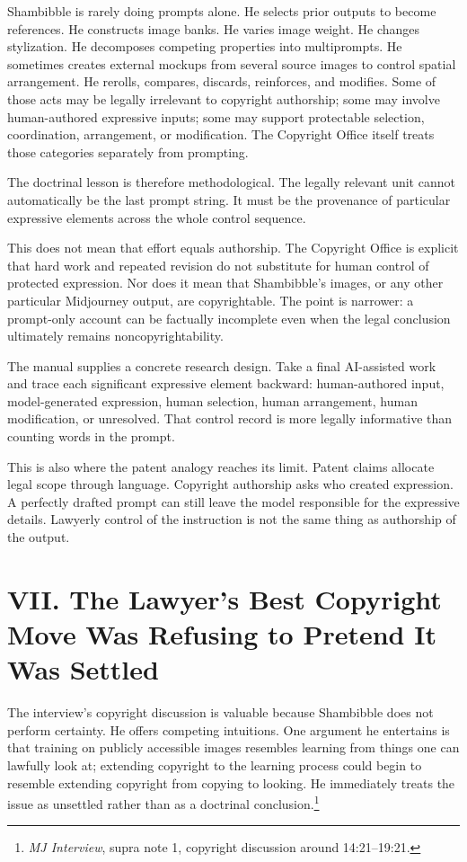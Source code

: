 \documentclass[11pt]{article}
\begin{document}
Shambibble is rarely doing prompts alone. He selects prior outputs to become references. He constructs image banks. He varies image weight. He changes stylization. He decomposes competing properties into multiprompts. He sometimes creates external mockups from several source images to control spatial arrangement. He rerolls, compares, discards, reinforces, and modifies. Some of those acts may be legally irrelevant to copyright authorship; some may involve human-authored expressive inputs; some may support protectable selection, coordination, arrangement, or modification. The Copyright Office itself treats those categories separately from prompting.

The doctrinal lesson is therefore methodological. The legally relevant unit cannot automatically be the last prompt string. It must be the provenance of particular expressive elements across the whole control sequence.

This does not mean that effort equals authorship. The Copyright Office is explicit that hard work and repeated revision do not substitute for human control of protected expression. Nor does it mean that Shambibble's images, or any other particular Midjourney output, are copyrightable. The point is narrower: a prompt-only account can be factually incomplete even when the legal conclusion ultimately remains noncopyrightability.

The manual supplies a concrete research design. Take a final AI-assisted work and trace each significant expressive element backward: human-authored input, model-generated expression, human selection, human arrangement, human modification, or unresolved. That control record is more legally informative than counting words in the prompt.

This is also where the patent analogy reaches its limit. Patent claims allocate legal scope through language. Copyright authorship asks who created expression. A perfectly drafted prompt can still leave the model responsible for the expressive details. Lawyerly control of the instruction is not the same thing as authorship of the output.

\section*{VII. The Lawyer's Best Copyright Move Was Refusing to Pretend It Was Settled}
The interview's copyright discussion is valuable because Shambibble does not perform certainty. He offers competing intuitions. One argument he entertains is that training on publicly accessible images resembles learning from things one can lawfully look at; extending copyright to the learning process could begin to resemble extending copyright from copying to looking. He immediately treats the issue as unsettled rather than as a doctrinal conclusion.\footnote{\emph{MJ Interview}, supra note 1, copyright discussion around 14:21--19:21.}
\end{document}
